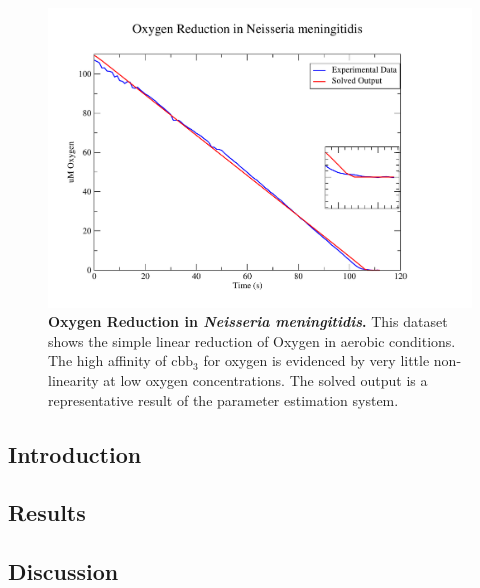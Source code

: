\begin{figure}[ht!]
 \centering
 \includegraphics[width=14cm]{./05-oxygenreduction/data/o2sim.pdf}
 \caption{{\bf Oxygen Reduction in \textit{Neisseria meningitidis}.} This dataset shows the simple linear reduction of Oxygen in aerobic conditions. The high affinity of $\mathrm{cbb}_3$ for oxygen is evidenced by very little non-linearity at low oxygen concentrations. The solved output is a representative result of the parameter estimation system.}
 \label{fig:o2sim}
\end{figure}

\subsection{Introduction}
\subsection{Results}
\subsection{Discussion}